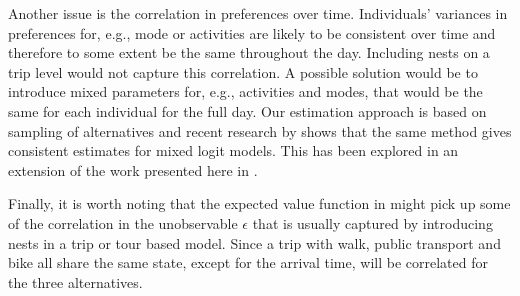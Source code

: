  Another issue is the correlation in preferences over time. Individuals' variances in preferences for, e.g., mode or activities are likely to be consistent over time and therefore to some extent be the same throughout the day. Including nests on a trip level would not capture this correlation. A possible solution would be to introduce mixed parameters for, e.g., activities and modes, that would be the same for each individual for the full day. Our estimation approach is based on sampling of alternatives and recent research by \citet{Guevara13} shows that the same method gives consistent estimates for mixed logit models. This has been explored in an extension of the work presented here in \citep{maelleMixed17}.

Finally, it is worth noting that the expected value function in  might pick up some of the correlation in the unobservable $\epsilon$ that is usually captured by introducing nests in a trip or tour based model. Since a trip with walk, public transport and bike all share the same state, except for the arrival time, \eutil will be correlated for the three alternatives. 
